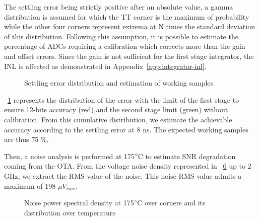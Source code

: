 The settling error being strictly positive after an absolute value, a gamma distribution is assumed for which the TT corner is the maximum of probability while the other four corners represent extrema at N times the standard deviation of this distribution. Following this assumption, it is possible to estimate the percentage of ADCs requiring a calibration which corrects more than the gain and offset errors. Since the gain is not sufficient for the first stage integrator, the INL is affected as demonstrated in Appendix~\ref{app:integrator-inl}.

\begin{figure}[htp]
    \centering
    \begin{subfigure}[b]{0.39\textwidth}
        \resizebox{\textwidth}{!}{
            
        }
        \label{fig:ota_error_dist}
    \end{subfigure}
    \begin{subfigure}[b]{0.58\textwidth}
        \resizebox{\textwidth}{!}{
            
        }
        \label{fig:ota_working_samples}
    \end{subfigure}
    \caption{Settling error distribution and estimation of working samples}
    \label{fig:ota_dist_sample}
\end{figure}

\figurename~\ref{fig:ota_error_dist} represents the distribution of the error with the limit of the first stage to ensure 12-bits accuracy (red) and the second stage limit (green) without calibration. From this cumulative distribution, we estimate the achievable accuracy according to the settling error at 8 ns. The expected working samples are thus 75 \%.

Then, a noise analysis is performed at 175\(\degree \)C to estimate SNR degradation coming from the OTA. From the voltage noise density represented in \figurename~\ref{fig:ota_noise_psd} up to 2 GHz, we extract the RMS value of the noise. This noise RMS value admits a maximum of 198 \(\mu V_{rms} \).

\begin{figure}[htp]
    \centering
    \begin{subfigure}[b]{0.43\textwidth}
        \resizebox{\textwidth}{!}{
            
        }
        \label{fig:noise_spectral_density}
    \end{subfigure}
    \begin{subfigure}[b]{0.56\textwidth}
        \resizebox{\textwidth}{!}{
            
        }
        \label{fig:noise_spectral_density}
    \end{subfigure}
    \caption{Noise power spectral density at 175\(\degree \)C over corners and its distribution over temperature}
    \label{fig:ota_noise_psd}
\end{figure}
\clearpage

